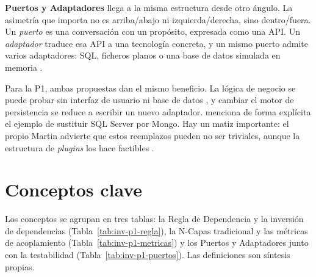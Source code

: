 \textbf{Puertos y Adaptadores} llega a la misma estructura desde otro ángulo. La asimetría que importa no es arriba/abajo ni izquierda/derecha, sino dentro/fuera. Un \emph{puerto} es una conversación con un propósito, expresada como una API. Un \emph{adaptador} traduce esa API a una tecnología concreta, y un mismo puerto admite varios adaptadores: SQL, ficheros planos o una base de datos simulada en memoria \citep[«Nature of the Solution»]{cockburn2005}.

Para la P1, ambas propuestas dan el mismo beneficio. La lógica de negocio se puede probar sin interfaz de usuario ni base de datos \parencites[p.~202]{martin2017}[«Intent»]{cockburn2005}, y cambiar el motor de persistencia se reduce a escribir un nuevo adaptador. \citet[p.~202]{martin2017} menciona de forma explícita el ejemplo de sustituir SQL Server por Mongo. Hay un matiz importante: el propio Martin advierte que estos reemplazos pueden no ser triviales, aunque la estructura de \emph{plugins} los hace factibles .

\section{Conceptos clave}

Los conceptos se agrupan en tres tablas: la Regla de Dependencia y la inversión de dependencias (Tabla~\ref{tab:inv-p1-regla}), la N-Capas tradicional y las métricas de acoplamiento (Tabla~\ref{tab:inv-p1-metricas}) y los Puertos y Adaptadores junto con la testabilidad (Tabla~\ref{tab:inv-p1-puertos}). Las definiciones son síntesis propias.

